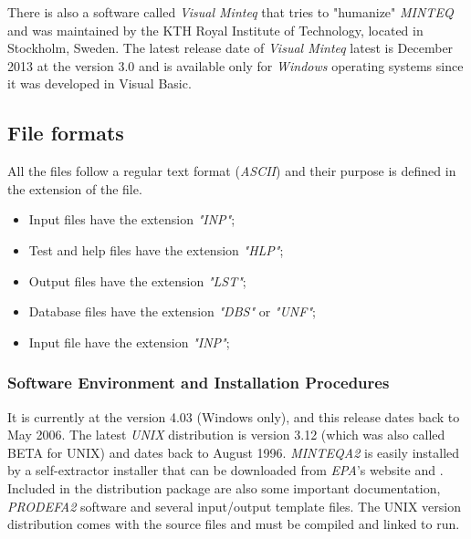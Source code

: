 There is also a software called \emph{Visual Minteq} that tries to "humanize" \emph{MINTEQ} and was maintained by the KTH Royal Institute of Technology, located in Stockholm, Sweden. The latest release date of \emph{Visual Minteq} latest is December 2013 at the version 3.0 and is available only for \emph{Windows} operating systems since it was developed in Visual Basic. 

\subsection{File formats}
All the files follow a regular text format (\emph{ASCII}) and their purpose is defined in the extension of the file. 
\begin{itemize}
\item Input files have the extension \emph{"INP"};
\item Test and help files have the extension \emph{"HLP"};
\item Output files have the extension \emph{"LST"};
\item Database files have the extension \emph{"DBS"} or \emph{"UNF"};
\item Input file have the extension \emph{"INP"};
\end{itemize}


\subsubsection{Software Environment and Installation Procedures}
It is currently at the version 4.03 (Windows only), and this release dates back to May 2006. The latest \emph{UNIX} distribution is version 3.12 (which was also called BETA for UNIX) and dates back to August 1996.
\emph{MINTEQA2} is easily installed by a self-extractor installer that can be downloaded from \emph{EPA}'s website \cite{minteq:website} and \cite{minteq:unix}. Included in the distribution package are also some important documentation, \emph{PRODEFA2} software and several input/output template files.
The UNIX version distribution comes with the source files and must be compiled and linked to run.

